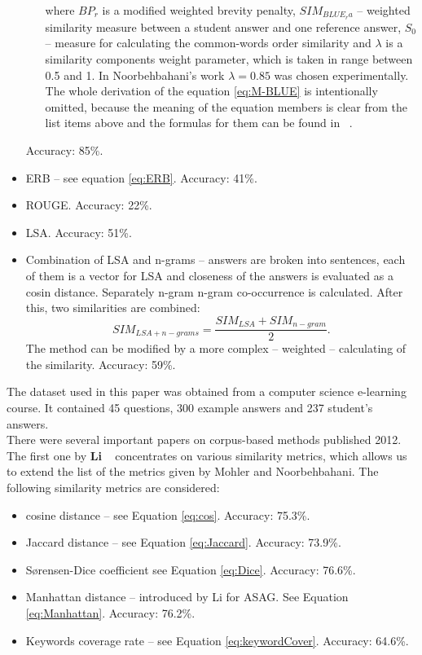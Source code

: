 \begin{itemize}
\begin{itemize}
\begin{equation}
\end{equation}
where $BP_r$ is a modified weighted brevity penalty, $SIM_{BLUE_ra}$ -- weighted similarity measure between a student answer and one reference answer, $S_0$ --  measure for calculating the common-words order similarity and $\lambda$ is a similarity components weight parameter, which is taken in range between 0.5 and 1. In Noorbehbahani's work $\lambda = 0.85$ was chosen experimentally. The whole derivation of the equation \ref{eq:M-BLUE} is intentionally omitted, because the meaning of the equation members is clear from the list items above and the formulas for them can be found in ~\cite{Noorbehbahani}.
\end{itemize}
Accuracy: 85\%.
\item ERB -- see equation \ref{eq:ERB}. Accuracy: 41\%.
\item ROUGE. Accuracy: 22\%.
\item LSA. Accuracy: 51\%.
\item Combination of LSA and n-grams -- answers are broken into sentences, each of them is a vector for LSA and closeness of the answers is evaluated as a cosin distance. Separately n-gram n-gram co-occurrence is calculated. After this, two similarities are combined:\\
\begin{equation} \label{eq:LSA+n-grams}
SIM_{LSA+n-grams} = \frac{SIM_{LSA} + SIM_{n-gram}}{2}.
\end{equation}
The method can be modified by a more complex -- weighted -- calculating of the similarity. Accuracy: 59\%.
\end{itemize}

The dataset used in this paper was obtained from a computer science e-learning course. It contained 45 questions, 300 example answers and 237 student's answers.\\

There were several important papers on corpus-based methods published 2012. The first one by \textbf{Li} ~\cite{Li} concentrates on various similarity metrics, which allows us to extend the list of the metrics given by Mohler and Noorbehbahani. The following similarity metrics are considered:

\begin{itemize}
\item cosine distance -- see Equation \ref{eq:cos}. Accuracy: 75.3\%.
\item Jaccard distance -- see Equation \ref{eq:Jaccard}. Accuracy: 73.9\%.
\item S{\o}rensen-Dice coefficient see Equation \ref{eq:Dice}. Accuracy: 76.6\%.
\item Manhattan distance -- introduced by Li for ASAG. See Equation \ref{eq:Manhattan}. Accuracy: 76.2\%.
\item Keywords coverage rate -- see Equation \ref{eq:keywordCover}. Accuracy: 64.6\%.
\end{itemize}

